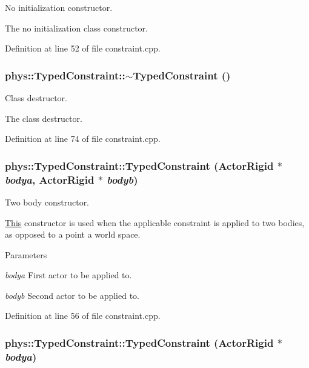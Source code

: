 No initialization constructor. 

The no initialization class constructor. 

Definition at line 52 of file constraint.cpp.

\hypertarget{classphys_1_1TypedConstraint_abf1cb6e3cf5c62feac31805162ec2766}{
\subsubsection[{$\sim$TypedConstraint}]{\setlength{\rightskip}{0pt plus 5cm}phys::TypedConstraint::$\sim$TypedConstraint ()}}
\label{d1/d17/classphys_1_1TypedConstraint_abf1cb6e3cf5c62feac31805162ec2766}


Class destructor. 

The class destructor. 

Definition at line 74 of file constraint.cpp.

\hypertarget{classphys_1_1TypedConstraint_a50ca8631a6c75bbc609c8d4ed61fdcee}{
\subsubsection[{TypedConstraint}]{\setlength{\rightskip}{0pt plus 5cm}phys::TypedConstraint::TypedConstraint ({\bf ActorRigid} $\ast$ {\em bodya}, \/  {\bf ActorRigid} $\ast$ {\em bodyb})}}
\label{d1/d17/classphys_1_1TypedConstraint_a50ca8631a6c75bbc609c8d4ed61fdcee}


Two body constructor. 

\hyperlink{structThis}{This} constructor is used when the applicable constraint is applied to two bodies, as opposed to a point a world space. 
\begin{DoxyParams}{Parameters}
\item[{\em bodya}]First actor to be applied to. \item[{\em bodyb}]Second actor to be applied to. \end{DoxyParams}


Definition at line 56 of file constraint.cpp.

\hypertarget{classphys_1_1TypedConstraint_a41ad08bfde377e91f2b37b0af40a9d34}{
\subsubsection[{TypedConstraint}]{\setlength{\rightskip}{0pt plus 5cm}phys::TypedConstraint::TypedConstraint ({\bf ActorRigid} $\ast$ {\em bodya})}}
\label{d1/d17/classphys_1_1TypedConstraint_a41ad08bfde377e91f2b37b0af40a9d34}


